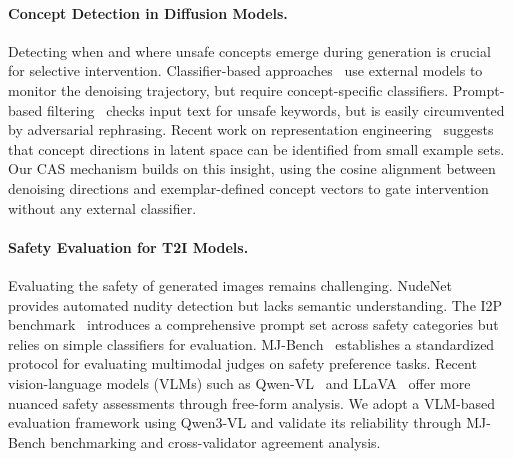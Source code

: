 \paragraph{Concept Detection in Diffusion Models.}
Detecting when and where unsafe concepts emerge during generation is crucial for selective intervention. Classifier-based approaches~\citep{Dhariwal2021Diffusion} use external models to monitor the denoising trajectory, but require concept-specific classifiers. Prompt-based filtering~\citep{rando2022red} checks input text for unsafe keywords, but is easily circumvented by adversarial rephrasing. Recent work on representation engineering~\citep{zou2023representation} suggests that concept directions in latent space can be identified from small example sets. Our CAS mechanism builds on this insight, using the cosine alignment between denoising directions and exemplar-defined concept vectors to gate intervention without any external classifier.

\paragraph{Safety Evaluation for T2I Models.}
Evaluating the safety of generated images remains challenging. NudeNet~\citep{notai_nudenet_2019} provides automated nudity detection but lacks semantic understanding. The I2P benchmark~\citep{schramowski2023safe} introduces a comprehensive prompt set across safety categories but relies on simple classifiers for evaluation. MJ-Bench~\citep{chen2025mjbench} establishes a standardized protocol for evaluating multimodal judges on safety preference tasks. Recent vision-language models (VLMs) such as Qwen-VL~\citep{bai2025qwen3vl} and LLaVA~\citep{liu2023visual} offer more nuanced safety assessments through free-form analysis. We adopt a VLM-based evaluation framework using Qwen3-VL and validate its reliability through MJ-Bench benchmarking and cross-validator agreement analysis.
